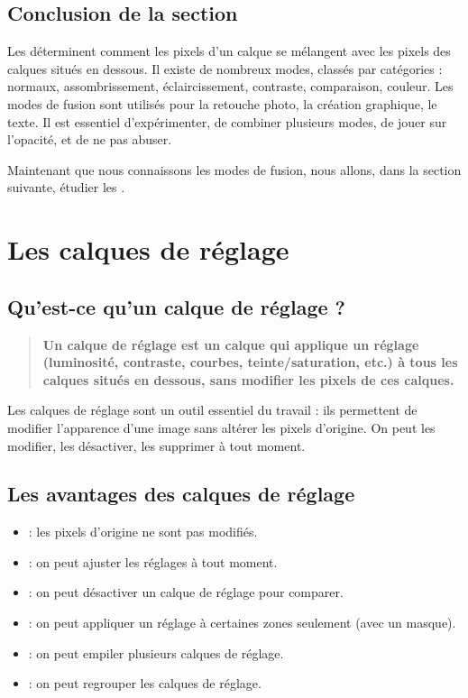 \subsection*{Conclusion de la section}

Les  déterminent comment les pixels d'un calque se mélangent avec les pixels des calques situés en dessous. Il existe de nombreux modes, classés par catégories : normaux, assombrissement, éclaircissement, contraste, comparaison, couleur. Les modes de fusion sont utilisés pour la retouche photo, la création graphique, le texte. Il est essentiel d'expérimenter, de combiner plusieurs modes, de jouer sur l'opacité, et de ne pas abuser.

Maintenant que nous connaissons les modes de fusion, nous allons, dans la section suivante, étudier les .

\section{Les calques de réglage}

\subsection{Qu'est-ce qu'un calque de réglage ?}

\begin{quote}
\textbf{Un calque de réglage est un calque qui applique un réglage (luminosité, contraste, courbes, teinte/saturation, etc.) à tous les calques situés en dessous, sans modifier les pixels de ces calques.}
\end{quote}

Les calques de réglage sont un outil essentiel du travail  : ils permettent de modifier l'apparence d'une image sans altérer les pixels d'origine. On peut les modifier, les désactiver, les supprimer à tout moment.

\subsection{Les avantages des calques de réglage}

\begin{itemize}
    \item {} : les pixels d'origine ne sont pas modifiés.
    \item {} : on peut ajuster les réglages à tout moment.
    \item {} : on peut désactiver un calque de réglage pour comparer.
    \item {} : on peut appliquer un réglage à certaines zones seulement (avec un masque).
    \item {} : on peut empiler plusieurs calques de réglage.
    \item {} : on peut regrouper les calques de réglage.
\end{itemize}

